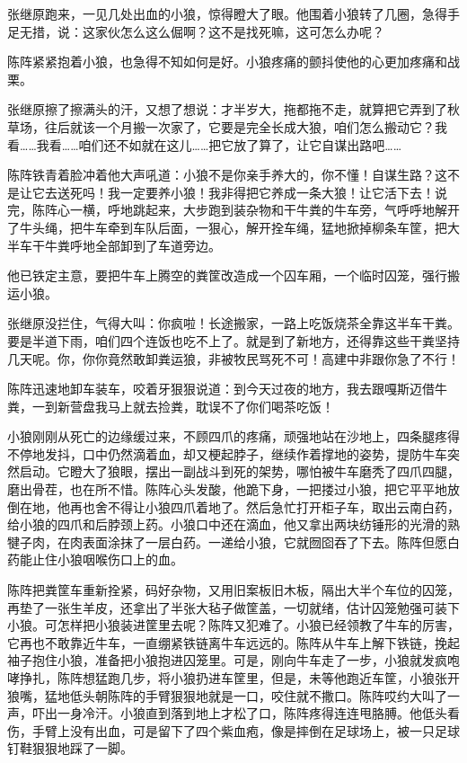 \par 张继原跑来，一见几处出血的小狼，惊得瞪大了眼。他围着小狼转了几圈，急得手足无措，说：这家伙怎么这么倔啊？这不是找死嘛，这可怎么办呢？
\par 陈阵紧紧抱着小狼，也急得不知如何是好。小狼疼痛的颤抖使他的心更加疼痛和战栗。
\par 张继原擦了擦满头的汗，又想了想说：才半岁大，拖都拖不走，就算把它弄到了秋草场，往后就该一个月搬一次家了，它要是完全长成大狼，咱们怎么搬动它？我看……我看……咱们还不如就在这儿……把它放了算了，让它自谋出路吧……
\par 陈阵铁青着脸冲着他大声吼道：小狼不是你亲手养大的，你不懂！自谋生路？这不是让它去送死吗！我一定要养小狼！我非得把它养成一条大狼！让它活下去！说完，陈阵心一横，呼地跳起来，大步跑到装杂物和干牛粪的牛车旁，气呼呼地解开了牛头绳，把牛车牵到车队后面，一狠心，解开拴车绳，猛地掀掉柳条车筐，把大半车干牛粪呼地全部卸到了车道旁边。
\par 他已铁定主意，要把牛车上腾空的粪筐改造成一个囚车厢，一个临时囚笼，强行搬运小狼。
\par 张继原没拦住，气得大叫：你疯啦！长途搬家，一路上吃饭烧茶全靠这半车干粪。要是半道下雨，咱们四个连饭也吃不上了。就是到了新地方，还得靠这些干粪坚持几天呢。你，你你竟然敢卸粪运狼，非被牧民骂死不可！高建中非跟你急了不行！
\par 陈阵迅速地卸车装车，咬着牙狠狠说道：到今天过夜的地方，我去跟嘎斯迈借牛粪，一到新营盘我马上就去捡粪，耽误不了你们喝茶吃饭！
\par 小狼刚刚从死亡的边缘缓过来，不顾四爪的疼痛，顽强地站在沙地上，四条腿疼得不停地发抖，口中仍然滴着血，却又梗起脖子，继续作着撑地的姿势，提防牛车突然启动。它瞪大了狼眼，摆出一副战斗到死的架势，哪怕被牛车磨秃了四爪四腿，磨出骨茬，也在所不惜。陈阵心头发酸，他跪下身，一把搂过小狼，把它平平地放倒在地，他再也舍不得让小狼四爪着地了。然后急忙打开柜子车，取出云南白药，给小狼的四爪和后脖颈上药。小狼口中还在滴血，他又拿出两块纺锤形的光滑的熟犍子肉，在肉表面涂抹了一层白药。一递给小狼，它就囫囵吞了下去。陈阵但愿白药能止住小狼咽喉伤口上的血。
\par 陈阵把粪筐车重新拴紧，码好杂物，又用旧案板旧木板，隔出大半个车位的囚笼，再垫了一张生羊皮，还拿出了半张大毡子做筐盖，一切就绪，估计囚笼勉强可装下小狼。可怎样把小狼装进筐里去呢？陈阵又犯难了。小狼已经领教了牛车的厉害，它再也不敢靠近牛车，一直绷紧铁链离牛车远远的。陈阵从牛车上解下铁链，挽起袖子抱住小狼，准备把小狼抱进囚笼里。可是，刚向牛车走了一步，小狼就发疯咆哮挣扎，陈阵想猛跑几步，将小狼扔进车筐里，但是，未等他跑近车筐，小狼张开狼嘴，猛地低头朝陈阵的手臂狠狠地就是一口，咬住就不撒口。陈阵哎约大叫了一声，吓出一身冷汗。小狼直到落到地上才松了口，陈阵疼得连连甩胳膊。他低头看伤，手臂上没有出血，可是留下了四个紫血疱，像是摔倒在足球场上，被一只足球钉鞋狠狠地踩了一脚。
